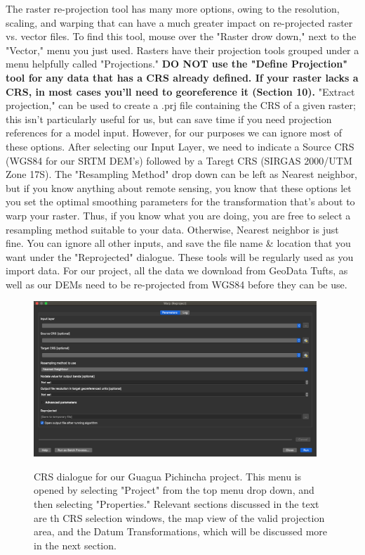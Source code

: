 \documentclass{article}
\begin{document}
The raster re-projection tool has many more options, owing to the resolution, scaling, and warping that can have a much greater impact on re-projected raster vs. vector files. To find this tool, mouse over the "Raster drow down," next to the "Vector," menu you just used. Rasters have their projection tools grouped under a menu helpfully called "Projections." \textbf{DO NOT use the "Define Projection" tool for any data that has a CRS already defined. If your raster lacks a CRS, in most cases you'll need to georeference it (Section 10).} "Extract projection," can be used to create a .prj file containing the CRS of a given raster; this isn't particularly useful for us, but can save time if you need projection references for a model input. However, for our purposes we can ignore most of these options. After selecting our Input Layer, we need to indicate a Source CRS (WGS84 for our SRTM DEM's) followed by a Taregt CRS (SIRGAS 2000/UTM Zone 17S). The "Resampling Method" drop down can be left as Nearest neighbor, but if you know anything about remote sensing, you know that these options let you set the optimal smoothing parameters for the transformation that's about to warp your raster. Thus, if you know what you are doing, you are free to select a resampling method suitable to your data. Otherwise, Nearest neighbor is just fine. You can ignore all other inputs, and save the file name \& location that you want under the "Reprojected" dialogue. These tools will be regularly used as you import data. For our project, all the data we download from GeoData \@ Tufts, as well as our DEMs need to be re-projected from WGS84 before they can be use. 

\begin{figure}[htbp]
    \centering
    \includegraphics[width=0.95\textwidth]{Fig_17_reproj_raster.png}
    \label{fig13}
    \caption{CRS dialogue for our Guagua Pichincha project. This menu is opened by selecting "Project" from the top menu drop down, and then selecting "Properties." Relevant sections discussed in the text are th CRS selection windows, the map view of the valid projection area, and the Datum Transformations, which will be discussed more in the next section.}
\end{figure}
\end{document}
